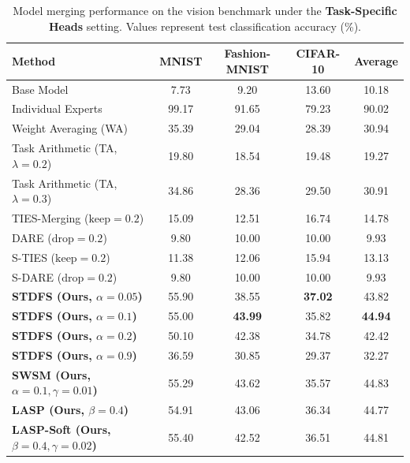 \documentclass{article}
\theoremstyle{plain}
\theoremstyle{definition}
\theoremstyle{remark}
\begin{document}
\begin{table}[t]
\caption{Model merging performance on the vision benchmark under the \textbf{Task-Specific Heads} setting. Values represent test classification accuracy (\%).}
\label{tab:results_task_specific}
\vskip 0.05in
\begin{center}
\begin{footnotesize}
\begin{tabular}{lcccc}
\toprule
Method & MNIST & Fashion-MNIST & CIFAR-10 & Average \\
\midrule
Base Model & 7.73 & 9.20 & 13.60 & 10.18 \\
Individual Experts & 99.17 & 91.65 & 79.23 & 90.02 \\
\midrule
Weight Averaging (WA) & 35.39 & 29.04 & 28.39 & 30.94 \\
Task Arithmetic (TA, $\lambda=0.2$) & 19.80 & 18.54 & 19.48 & 19.27 \\
Task Arithmetic (TA, $\lambda=0.3$) & 34.86 & 28.36 & 29.50 & 30.91 \\
\midrule
TIES-Merging ($\text{keep}=0.2$) & 15.09 & 12.51 & 16.74 & 14.78 \\
DARE ($\text{drop}=0.2$) & 9.80 & 10.00 & 10.00 & 9.93 \\
S-TIES ($\text{keep}=0.2$) & 11.38 & 12.06 & 15.94 & 13.13 \\
S-DARE ($\text{drop}=0.2$) & 9.80 & 10.00 & 10.00 & 9.93 \\
\midrule
\textbf{STDFS (Ours, $\alpha=0.05$)} & 55.90 & 38.55 & \textbf{37.02} & 43.82 \\
\textbf{STDFS (Ours, $\alpha=0.1$)} & 55.00 & \textbf{43.99} & 35.82 & \textbf{44.94} \\
\textbf{STDFS (Ours, $\alpha=0.2$)} & 50.10 & 42.38 & 34.78 & 42.42 \\
\textbf{STDFS (Ours, $\alpha=0.9$)} & 36.59 & 30.85 & 29.37 & 32.27 \\
\midrule
\textbf{SWSM (Ours, $\alpha=0.1, \gamma=0.01$)} & 55.29 & 43.62 & 35.57 & 44.83 \\
\textbf{LASP (Ours, $\beta=0.4$)} & 54.91 & 43.06 & 36.34 & 44.77 \\
\textbf{LASP-Soft (Ours, $\beta=0.4, \gamma=0.02$)} & 55.40 & 42.52 & 36.51 & 44.81 \\
\bottomrule
\end{tabular}
\end{footnotesize}
\end{center}
\vskip -0.1in
\end{table}
\end{document}
